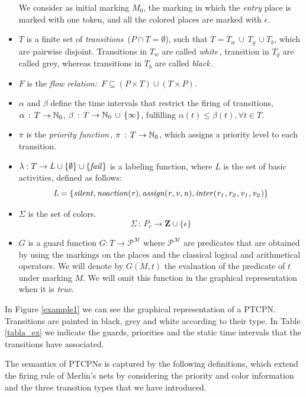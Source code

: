 \begin{definition}
\begin{itemize}
We consider as  initial marking $M_0$,  the marking in which the
{\it entry} place is marked with one token, and all the colored
places are marked with $\epsilon$.


\item  $T$ is a finite set of {\em
transitions}\, ($P \cap T = \emptyset$), such that
$T=T_w\,\cup\,T_g\,\cup T_b$, which are pairwise disjoint.
Transitions in $T_w$ are called {\em white}\,, transition in $T_g$
are called grey,  whereas transitions in $T_b$ are called {\em
black}\,.
%
\item $F$ is the {\em flow relation:\,} $F
\subseteq (P \times T) \cup (T \times P)$.
%
\item $\alpha$ and
$\beta$ define the time intervals that restrict
the firing of transitions, $\alpha\,:\, T \rightarrow \mathbb{N}_{0}$,
$\beta\,:\, T \rightarrow \mathbb{N}_{0}\,\cup\,\{\infty\}$, fulfilling
$\alpha(t)\leq
\beta(t), \forall t \in T$. 
%
\item $\pi$ is the {\em priority
function\,},\; $\pi\,:\,T \rightarrow \mathbb{N}_{0}$, which assigns a
priority level to each transition.
%
\item $\lambda: T \rightarrow L \cup \{\emptyset\} \cup \{{\it fail}\}$ is a
labeling function, where $L$ is the set of basic activities,
defined as follows: $$ {\it L=\{silent, noaction(r), assign(r,v,n),
inter(r_1,r_2,v_1,v_2)\}}$$
%
\item $\Sigma$ is the set of colors.
\[ \Sigma \, : \, P_c \rightarrow \mathbf{Z} \cup \{ \epsilon \} \]
%
\item $G$ is a guard function $G: T \rightarrow \mathcal{P^M}$ where $\mathcal{P^M}$ are predicates that are obtained by using the markings on the places and the classical logical and arithmetical operators.  We will denote by $G(M,t)$ the evaluation of the predicate of $t$ under marking $M$. We will omit this function in the graphical representation when it is {\it true}.
\end{itemize}
%
\end{definition}

\begin{example} \label{ex1} In Figure \ref{example1} we can see the graphical
representation of a PTCPN. Transitions are painted in black, grey
and white according to their type. In Table \ref{tabla_ex} we
indicate the guards, priorities and the static time intervals that
the transitions  have associated.  \end{example}


The semantics of PTCPNs is captured by the following definitions, which
extend the firing rule of Merlin's nets by considering the priority
and color information and the three transition types that we have
introduced.

